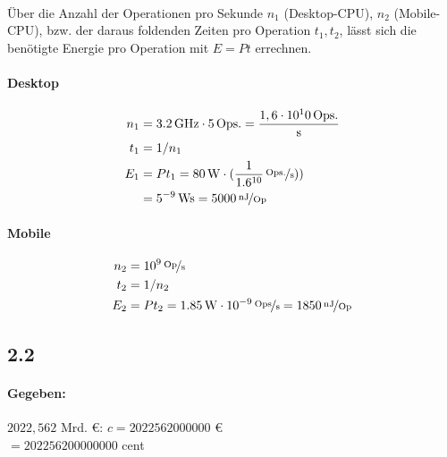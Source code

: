 \documentclass[11pt,a4paper]{article}
\begin{document}
\paragraph{}
Über die Anzahl der Operationen pro Sekunde $n_1$ (Desktop-CPU), $n_2$ (Mobile-CPU), bzw. der daraus foldenden Zeiten pro Operation $t_1, t_2$, lässt sich die benötigte Energie pro Operation mit $E = Pt$ errechnen.

\paragraph{Desktop}
\begin{align}
n_1 &= \unit[3.2]{GHz} \cdot \unit[5]{Ops.} = \frac{1,6 \cdot \unit[10^10]{Ops.}}{\unit{s}}\\
t_1 &= 1/n_1\\
E_1 &= Pt_1 = \unit[80]{W} \cdot (\unitfrac[\frac{1}{1.6^{10}}]{Ops.}{s}))\\
&= \unit[5^{-9}]{Ws} = \unitfrac[5000]{nJ}{Op}\\
\end{align}

\paragraph{Mobile}
\begin{align}
n_2 &= \unitfrac[10^9]{Op}{s}\\
t_2 &= 1/n_2\\
E_2 &= Pt_2 = \unit[1.85]{W} \cdot \unitfrac[10^{-9}]{Ops}{s} = \unitfrac[1850]{nJ}{Op}
\end{align}



\subsection{2.2}
\paragraph{Gegeben:}
$2022,562$ Mrd. \euro: $c = 2022562000000$ \euro\\
$= 202256200000000$ cent
\end{document}
